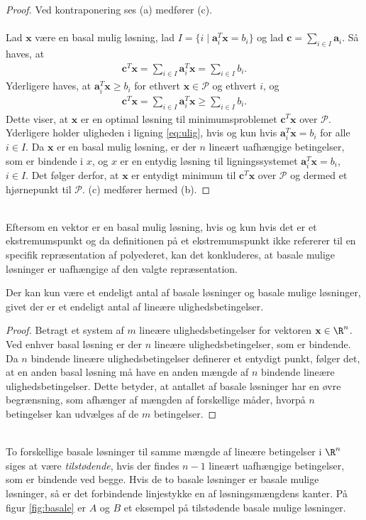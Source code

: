 \begin{proof}
Ved kontraponering ses (a) medfører (c).
\\\\
%
Lad $\textbf{x}$ være en basal mulig løsning, lad $I = \{i \mid \textbf{a}_i^T\textbf{x} = b_i \}$ og lad $\textbf{c}=\sum_{i \in I} \textbf{a}_i$.
Så haves, at
%
\begin{align*}
\textbf{c}^T\textbf{x} = \sum_{i\in I}\textbf{a}_i^T\textbf{x} = \sum_{i\in I}b_i.
\end{align*}
%
Yderligere haves, at $\textbf{a}_i^T\textbf{x} \geq b_i$ for ethvert $\textbf{x} \in \mathcal{P}$ og ethvert $i$, og 
%
\begin{align}\label{eq:ulig}
\textbf{c}^T\textbf{x} = \sum_{i\in I}\textbf{a}_i^T\textbf{x} \geq \sum_{i\in I}b_i.
\end{align}
%
Dette viser, at $\textbf{x}$ er en optimal løsning til minimumsproblemet $\textbf{c}^T\textbf{x}$ over $\mathcal{P}$.
Yderligere holder uligheden i ligning \ref{eq:ulig}, hvis og kun hvis $\textbf{a}_i^T\textbf{x} = b_i$ for alle $i \in I$.
Da $\textbf{x}$ er en basal mulig løsning, er der $n$ lineært uafhængige betingelser, som er bindende i $x$, og $x$ er en entydig løsning til ligningssystemet $\textbf{a}_i^T\textbf{x} = b_i$, $i \in I$.
Det følger derfor, at $\textbf{x}$ er entydigt minimum til $\textbf{c}^T\textbf{x}$ over $\mathcal{P}$ og dermed et hjørnepunkt til $\mathcal{P}$.
(c) medfører hermed (b).
%
\end{proof}\\
%
Eftersom en vektor er en basal mulig løsning, hvis og kun hvis det er et ekstremumspunkt og da definitionen på et ekstremumspunkt ikke refererer til en specifik repræsentation af polyederet, kan det konkluderes, at basale mulige løsninger er uafhængige af den valgte repræsentation.
%
\begin{kor}{}{}
Der kan kun være et endeligt antal af basale løsninger og basale mulige løsninger, givet der er et endeligt antal af lineære ulighedsbetingelser.
\end{kor}
%
\begin{proof}
Betragt et system af $m$ lineære ulighedsbetingelser for vektoren $\textbf{x} \in \R^n$.
Ved enhver basal løsning er der $n$ lineære ulighedsbetingelser, som er bindende.
Da $n$ bindende lineære ulighedsbetingelser definerer et entydigt punkt, følger det, at en anden basal løsning må have en anden mængde af $n$ bindende lineære ulighedsbetingelser.
Dette betyder, at antallet af basale løsninger har en øvre begrænsning, som afhænger af mængden af forskellige måder, hvorpå $n$ betingelser kan udvælges af de $m$ betingelser.
\end{proof}\\
%
To forskellige basale løsninger til samme mængde af lineære betingelser i $\R^n$ siges at være \textit{tilstødende}, hvis der findes $n-1$ lineært uafhængige betingelser, som er bindende ved begge. 
Hvis de to basale løsninger er basale mulige løsninger, så er det forbindende linjestykke en af løsningsmængdens kanter.
På figur \ref{fig:basale} er $A$ og $B$ et eksempel på tilstødende basale mulige løsninger.